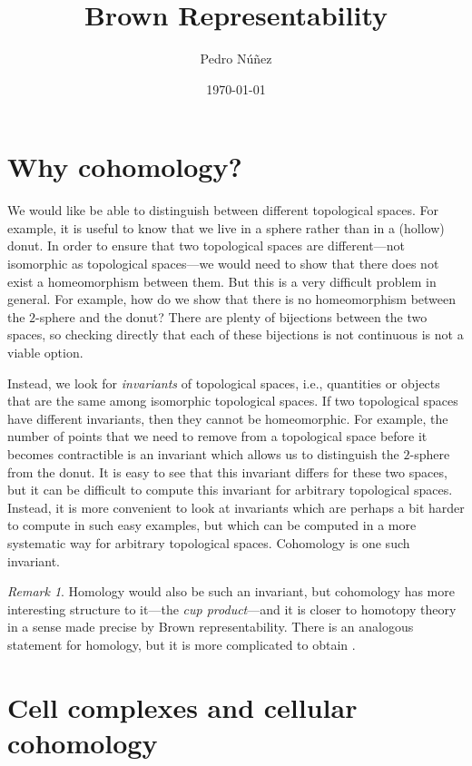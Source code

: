 \documentclass[12pt,a4paper]{amsart}
\title[Brown Representability]{Brown Representability}
\author[Pedro N\'{u}\~{n}ez]{Pedro N\'{u}\~{n}ez}\thanks{{\itshape Email:}~\href{mailto:pedro.nunez@math.uni-freiburg.de}{pedro.nunez@math.uni-freiburg.de}. \\ \indent {\itshape Homepage:}~\href{https://home.mathematik.uni-freiburg.de/nunez/?l=en}{https://home.mathematik.uni-freiburg.de/nunez}}
\date{\today}
\theoremstyle{plain}
\theoremstyle{definition}
\theoremstyle{remark}
\newtheorem{rem}[thm]{Remark}
\begin{document}
\maketitle

\tableofcontents

\section{Why cohomology?}

We would like be able to distinguish between different topological spaces.
For example, it is useful to know that we live in a sphere rather than in a (hollow) donut.
In order to ensure that two topological spaces are different---not isomorphic as topological spaces---we would need to show that there does not exist a homeomorphism between them.
But this is a very difficult problem in general.
For example, how do we show that there is no homeomorphism between the $2$-sphere and the donut?
There are plenty of bijections between the two spaces, so checking directly that each of these bijections is not continuous is not a viable option.

Instead, we look for \emph{invariants} of topological spaces, i.e., quantities or objects that are the same among isomorphic topological spaces.
If two topological spaces have different invariants, then they cannot be homeomorphic.
For example, the number of points that we need to remove from a topological space before it becomes contractible is an invariant which allows us to distinguish the $2$-sphere from the donut.
It is easy to see that this invariant differs for these two spaces, but it can be difficult to compute this invariant for arbitrary topological spaces.
Instead, it is more convenient to look at invariants which are perhaps a bit harder to compute in such easy examples, but which can be computed in a more systematic way for arbitrary topological spaces.
Cohomology is one such invariant.

\begin{rem}
  Homology would also be such an invariant, but cohomology has more interesting structure to it---the \emph{cup product}---and it is closer to homotopy theory in a sense made precise by Brown representability.
  There is an analogous statement for homology, but it is more complicated to obtain \cite[\S 4.F]{hat02}.
\end{rem}

\section{Cell complexes and cellular cohomology}
\end{document}
